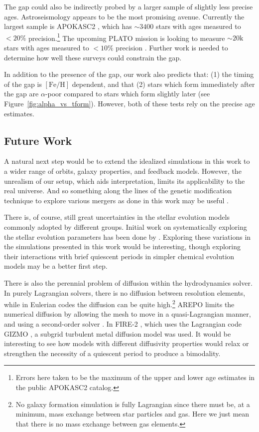 \documentclass[twocolumn,linenumbers,trackchanges]{aastex631}
\newcommand{\FeH}{\ensuremath{[\textrm{Fe}/\textrm{H}]}}
\begin{document}
The gap could also be indirectly probed by a larger sample of slightly less precise ages. Astroseismology appears to be the most promising avenue. Currently the largest sample is APOKASC2 \citep{2018ApJS..239...32P}, which has $\sim3400$ stars with ages measured to $<20\%$ precision.\footnote{Errors here taken to be the maximum of the upper and lower age estimates in the public APOKASC2 catalog.} The upcoming PLATO mission is looking to measure $\sim20\textrm{k}$ stars with ages measured to $<10\%$ precision \citep{2024arXiv240605447R}. Further work is needed to determine how well these surveys could constrain the gap.

In addition to the presence of the gap, our work also predicts that: (1) the timing of the gap is \FeH{} dependent, and that (2) stars which form immediately after the gap are $\alpha$-poor compared to stars which form slightly later (see Figure~\ref{fig:alpha_vs_tform}). However, both of these tests rely on the precise age estimates.

\subsection{Future Work}
A natural next step would be to extend the idealized simulations in this work to a wider range of orbits, galaxy properties, and feedback models. However, the unrealism of our setup, which aids interpretation, limits its applicability to the real universe. And so something along the lines of the genetic modification technique to explore various mergers as done in this work may be useful \citep{2016MNRAS.455..974R,2017MNRAS.465..547P}.

There is, of course, still great uncertainties in the stellar evolution models commonly adopted by different groups. Initial work on systematically exploring the stellar evolution parameters has been done by \citet{2017A&A...605A..59R,2021MNRAS.508.3365B}. Exploring these variations in the simulations presented in this work would be interesting, though exploring their interactions with brief quiescent periods in simpler chemical evolution models may be a better first step.

There is also the perennial problem of diffusion within the hydrodynamics solver. In purely Lagrangian solvers, there is no diffusion between resolution elements, while in Eulerian codes the diffusion can be quite high.\footnote{No galaxy formation simulation is fully Lagrangian since there must be, at a minimum, mass exchange between star particles and gas. Here we just mean that there is no mass exchange between gas elements.} AREPO limits the numerical diffusion by allowing the mesh to move in a quasi-Lagrangian manner, and using a second-order solver \citep{2010MNRAS.401..791S}. In FIRE-2 \citep{2018MNRAS.480..800H}, which uses the Lagrangian code GIZMO \citep{2015MNRAS.450...53H}, a subgrid turbulent metal diffusion model was used. It would be interesting to see how models with different diffusivity properties would relax or strengthen the necessity of a quiescent period to produce a bimodality.
\end{document}

